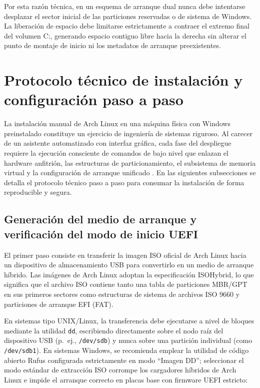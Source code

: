 \documentclass[12pt]{article}
\begin{document}
Por esta razón técnica, en un esquema de arranque dual nunca debe intentarse desplazar el sector inicial de las particiones reservadas o de sistema de Windows. La liberación de espacio debe limitarse estrictamente a contraer el extremo final del volumen C:, generando espacio contiguo libre hacia la derecha sin alterar el punto de montaje de inicio ni los metadatos de arranque preexistentes.

\section{Protocolo técnico de instalación y configuración paso a paso}
\label{sec:protocoloInstalacion}

La instalación manual de Arch Linux en una máquina física con Windows preinstalado constituye un ejercicio de ingeniería de sistemas riguroso. Al carecer de un asistente automatizado con interfaz gráfica, cada fase del despliegue requiere la ejecución consciente de comandos de bajo nivel que enlazan el hardware anfitrión, las estructuras de particionamiento, el subsistema de memoria virtual y la configuración de arranque unificado \parencite{arch2024install}. En las siguientes subsecciones se detalla el protocolo técnico paso a paso para consumar la instalación de forma reproducible y segura.

\subsection{Generación del medio de arranque y verificación del modo de inicio UEFI}
\label{sec:generacionMedioArranque}

El primer paso consiste en transferir la imagen ISO oficial de Arch Linux hacia un dispositivo de almacenamiento USB para convertirlo en un medio de arranque híbrido. Las imágenes de Arch Linux adoptan la especificación ISOHybrid, lo que significa que el archivo ISO contiene tanto una tabla de particiones MBR/GPT en sus primeros sectores como estructuras de sistema de archivos ISO 9660 y particiones de arranque EFI (FAT).

En sistemas tipo UNIX/Linux, la transferencia debe ejecutarse a nivel de bloques mediante la utilidad \texttt{dd}, escribiendo directamente sobre el nodo raíz del dispositivo USB (p.~ej., \texttt{/dev/sdb}) y nunca sobre una partición individual (como \texttt{/dev/sdb1}). En sistemas Windows, se recomienda emplear la utilidad de código abierto Rufus configurada estrictamente en modo \enquote{Imagen DD}; seleccionar el modo estándar de extracción ISO corrompe los cargadores híbridos de Arch Linux e impide el arranque correcto en placas base con firmware UEFI estricto:
\end{document}
